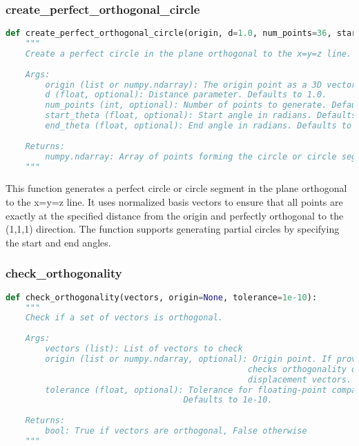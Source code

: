 \subsubsection{create\_perfect\_orthogonal\_circle}

\begin{lstlisting}[language=Python]
def create_perfect_orthogonal_circle(origin, d=1.0, num_points=36, start_theta=0, end_theta=2*math.pi):
    """
    Create a perfect circle in the plane orthogonal to the x=y=z line.
    
    Args:
        origin (list or numpy.ndarray): The origin point as a 3D vector [x, y, z]
        d (float, optional): Distance parameter. Defaults to 1.0.
        num_points (int, optional): Number of points to generate. Defaults to 36.
        start_theta (float, optional): Start angle in radians. Defaults to 0.
        end_theta (float, optional): End angle in radians. Defaults to 2*pi.
        
    Returns:
        numpy.ndarray: Array of points forming the circle or circle segment
    """
\end{lstlisting}

This function generates a perfect circle or circle segment in the plane orthogonal to the x=y=z line. It uses normalized basis vectors to ensure that all points are exactly at the specified distance from the origin and perfectly orthogonal to the (1,1,1) direction. The function supports generating partial circles by specifying the start and end angles.

\subsubsection{check\_orthogonality}

\begin{lstlisting}[language=Python]
def check_orthogonality(vectors, origin=None, tolerance=1e-10):
    """
    Check if a set of vectors is orthogonal.
    
    Args:
        vectors (list): List of vectors to check
        origin (list or numpy.ndarray, optional): Origin point. If provided, 
                                                 checks orthogonality of 
                                                 displacement vectors.
        tolerance (float, optional): Tolerance for floating-point comparison. 
                                    Defaults to 1e-10.
        
    Returns:
        bool: True if vectors are orthogonal, False otherwise
    """
\end{lstlisting}

